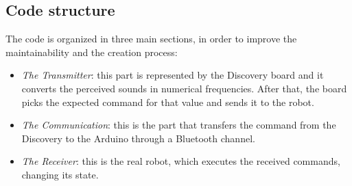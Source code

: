 \subsection{Code structure}
The code is organized in three main sections, in order to improve the maintainability and the creation process:
\begin{itemize}
	\item \textit{The Transmitter}: this part is represented by the Discovery board and it converts the perceived sounds in numerical frequencies. After that, the board picks the expected command for that value and sends it to the robot.
	\item \textit{The Communication}: this is the part that transfers the command from the Discovery to the Arduino through a Bluetooth channel.
	\item \textit{The Receiver}: this is the real robot, which executes the received commands, changing its state.
\end{itemize}
